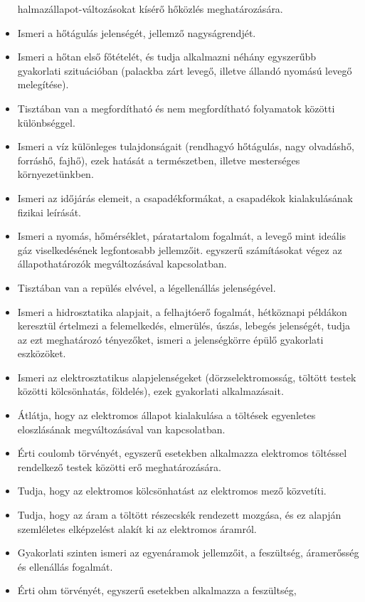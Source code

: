 \begin{itemize}
  halmazállapot-változásokat kísérő hőközlés meghatározására.
\item
  Ismeri a hőtágulás jelenségét, jellemző nagyságrendjét.
\item
  Ismeri a hőtan első főtételét, és tudja alkalmazni néhány egyszerűbb
  gyakorlati szituációban (palackba zárt levegő, illetve állandó nyomású
  levegő melegítése).
\item
  Tisztában van a megfordítható és nem megfordítható folyamatok közötti
  különbséggel.
\item
  Ismeri a víz különleges tulajdonságait (rendhagyó hőtágulás, nagy
  olvadáshő, forráshő, fajhő), ezek hatását a természetben, illetve
  mesterséges környezetünkben.
\item
  Ismeri az időjárás elemeit, a csapadékformákat, a csapadékok
  kialakulásának fizikai leírását.
\item
  Ismeri a nyomás, hőmérséklet, páratartalom fogalmát, a levegő mint
  ideális gáz viselkedésének legfontosabb jellemzőit. egyszerű
  számításokat végez az állapothatározók megváltozásával kapcsolatban.
\item
  Tisztában van a repülés elvével, a légellenállás jelenségével.
\item
  Ismeri a hidrosztatika alapjait, a felhajtóerő fogalmát, hétköznapi
  példákon keresztül értelmezi a felemelkedés, elmerülés, úszás, lebegés
  jelenségét, tudja az ezt meghatározó tényezőket, ismeri a
  jelenségkörre épülő gyakorlati eszközöket.
\item
  Ismeri az elektrosztatikus alapjelenségeket (dörzselektromosság,
  töltött testek közötti kölcsönhatás, földelés), ezek gyakorlati
  alkalmazásait.
\item
  Átlátja, hogy az elektromos állapot kialakulása a töltések egyenletes
  eloszlásának megváltozásával van kapcsolatban.
\item
  Érti coulomb törvényét, egyszerű esetekben alkalmazza elektromos
  töltéssel rendelkező testek közötti erő meghatározására.
\item
  Tudja, hogy az elektromos kölcsönhatást az elektromos mező közvetíti.
\item
  Tudja, hogy az áram a töltött részecskék rendezett mozgása, és ez
  alapján szemléletes elképzelést alakít ki az elektromos áramról.
\item
  Gyakorlati szinten ismeri az egyenáramok jellemzőit, a feszültség,
  áramerősség és ellenállás fogalmát.
\item
  Érti ohm törvényét, egyszerű esetekben alkalmazza a feszültség,

\end{itemize}

